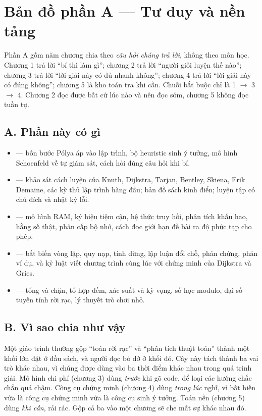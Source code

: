 \documentclass[../algorithm.tex]{subfiles}
\begin{document}
\section*{Bản đồ phần A --- Tư duy và nền tảng}

\begin{tomtat}
Phần A gồm năm chương chia theo \emph{câu hỏi chúng trả lời}, không theo môn học. Chương 1 trả lời ``bí thì làm gì''; chương 2 trả lời ``người giỏi luyện thế nào''; chương 3 trả lời ``lời giải này có đủ nhanh không''; chương 4 trả lời ``lời giải này có đúng không''; chương 5 là kho toán tra khi cần. Chuỗi bắt buộc chỉ là 1 \(\rightarrow\) 3 \(\rightarrow\) 4. Chương 2 đọc được bất cứ lúc nào và nên đọc sớm, chương 5 không đọc tuần tự.
\end{tomtat}

\subsection*{A. Phần này có gì}
\begin{itemize}
\item \textbf{} --- bốn bước Pólya áp vào lập trình, bộ heuristic sinh ý tưởng, mô hình Schoenfeld về tự giám sát, cách hỏi đúng câu hỏi khi bí.
\item \textbf{} --- khảo sát cách luyện của Knuth, Dijkstra, Tarjan, Bentley, Skiena, Erik Demaine, các kỳ thủ lập trình hàng đầu; bản đồ sách kinh điển; luyện tập có chủ đích và nhật ký lỗi.
\item \textbf{} --- mô hình RAM, ký hiệu tiệm cận, hệ thức truy hồi, phân tích khấu hao, hằng số thật, phân cấp bộ nhớ, cách đọc giới hạn đề bài ra độ phức tạp cho phép.
\item \textbf{} --- bất biến vòng lặp, quy nạp, tính dừng, lập luận đổi chỗ, phản chứng, phản ví dụ, và kỷ luật viết chương trình cùng lúc với chứng minh của Dijkstra và Gries.
\item \textbf{} --- tổng và chặn, tổ hợp đếm, xác suất và kỳ vọng, số học modulo, đại số tuyến tính rời rạc, lý thuyết trò chơi nhỏ.
\end{itemize}

\subsection*{B. Vì sao chia như vậy}
Một giáo trình thường gộp ``toán rời rạc'' và ``phân tích thuật toán'' thành một khối lớn đặt ở đầu sách, và người đọc bỏ dở ở khối đó. Cây này tách thành ba vai trò khác nhau, vì chúng được dùng vào ba thời điểm khác nhau trong quá trình giải. Mô hình chi phí (chương 3) dùng \emph{trước} khi gõ code, để loại các hướng chắc chắn quá chậm. Công cụ chứng minh (chương 4) dùng \emph{trong lúc} nghĩ, vì bất biến vừa là công cụ chứng minh vừa là công cụ sinh ý tưởng. Toán nền (chương 5) dùng \emph{khi cần}, rải rác. Gộp cả ba vào một chương sẽ che mất sự khác nhau đó.
\end{document}
